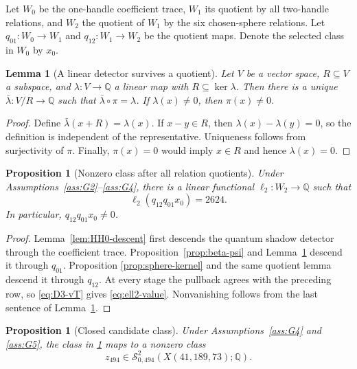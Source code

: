\documentclass[10pt,reqno]{amsart}
\newtheorem{proposition}[theorem]{Proposition}
\newtheorem{lemma}[theorem]{Lemma}
\theoremstyle{definition}
\theoremstyle{remark}
\newcommand{\Q}{\mathbb Q}
\newcommand{\SLM}{\mathcal S}
\begin{document}
Let $W_0$ be the one-handle coefficient trace, $W_1$ its quotient by all
two-handle relations, and $W_2$ the quotient of $W_1$ by the six chosen-sphere
relations.  Let $q_{01}:W_0\to W_1$ and $q_{12}:W_1\to W_2$ be the quotient
maps.  Denote the selected class in $W_0$ by $x_0$.

\begin{lemma}[A linear detector survives a quotient]\label{lem:quotient-detector}
Let $V$ be a vector space, $R\subseteq V$ a subspace, and
$\lambda:V\to\Q$ a linear map with $R\subseteq\ker\lambda$.  Then there is a
unique $\bar\lambda:V/R\to\Q$ such that
$\bar\lambda\circ\pi=\lambda$.  If $\lambda(x)\ne0$, then $\pi(x)\ne0$.
\end{lemma}

\begin{proof}
Define $\bar\lambda(x+R)=\lambda(x)$.  If $x-y\in R$, then
$\lambda(x)-\lambda(y)=0$, so the definition is independent of the
representative.  Uniqueness follows from surjectivity of $\pi$.  Finally,
$\pi(x)=0$ would imply $x\in R$ and hence $\lambda(x)=0$.
\end{proof}

\begin{proposition}[Nonzero class after all relation quotients]\label{prop:nonzero-W2}
Under Assumptions~\ref{ass:G2}--\ref{ass:G4},
there is a linear functional $\ell_2:W_2\to\Q$ such that
\begin{equation}\label{eq:ell2-value}
\ell_2(q_{12}q_{01}x_0)=2624.
\end{equation}
In particular, $q_{12}q_{01}x_0\ne0$.
\end{proposition}

\begin{proof}
Lemma~\ref{lem:HH0-descent} first descends the quantum shadow detector through
the coefficient trace.  Proposition~\ref{prop:beta-psi} and
Lemma~\ref{lem:quotient-detector} descend it through $q_{01}$.  Proposition
\ref{prop:sphere-kernel} and the same quotient lemma descend it through
$q_{12}$.  At every stage the pullback agrees with the preceding row, so
\cref{eq:D3-vT} gives \cref{eq:ell2-value}.  Nonvanishing follows from the
last sentence of Lemma~\ref{lem:quotient-detector}.
\end{proof}

\begin{proposition}[Closed candidate class]\label{prop:closed-class}
Under Assumptions~\ref{ass:G4} and \ref{ass:G5}, the class in
\cref{prop:nonzero-W2} maps to a nonzero
class
\begin{equation}\label{eq:closed-class}
z_{494}\in\SLM^2_{0,494}(X(41,189,73);\Q).
\end{equation}
\end{proposition}
\end{document}
